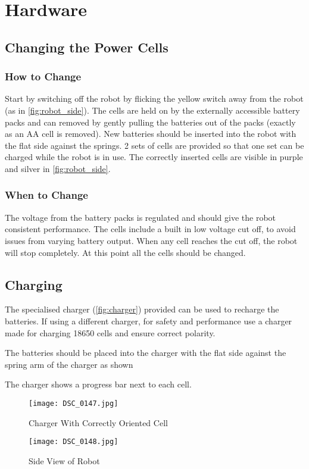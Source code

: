 
\section{Hardware}

\subsection{Changing the Power Cells}
\subsubsection{How to Change}
Start by switching off the robot by flicking the yellow switch away from the robot (as in \autoref{fig:robot_side}). The cells are held on by the externally accessible battery packs and can removed by gently pulling the batteries out of the packs (exactly as an AA cell is removed). New batteries should be inserted into the robot with the flat side against the springs. 2 sets of cells are provided so that one set can be charged while the robot is in use. The correctly inserted cells are visible in purple and silver in \autoref{fig:robot_side}.

\subsubsection{When to Change}
The voltage from the battery packs is regulated and should give the robot consistent performance. The cells include a built in low voltage cut off, to avoid issues from varying battery output. When any cell reaches the cut off, the robot will stop completely. At this point all the cells should be changed. 


\subsection{Charging}
The specialised charger (\autoref{fig:charger}) provided can be used to recharge the batteries. If using a different charger, for safety and performance use a charger made for charging 18650 cells and ensure correct polarity.

The batteries should be placed into the charger with the flat side against the spring arm of the charger as shown

The charger shows a progress bar next to each cell. 


\begin{figure}[hp]
\centering
\texttt{[image: DSC\_0147.jpg]}
\caption{Charger With Correctly Oriented Cell}
\label{fig:charger}
\end{figure}
\begin{figure}[hp]
\centering
\texttt{[image: DSC\_0148.jpg]}
\caption{Side View of Robot}
\label{fig:robot_side}
\end{figure}



